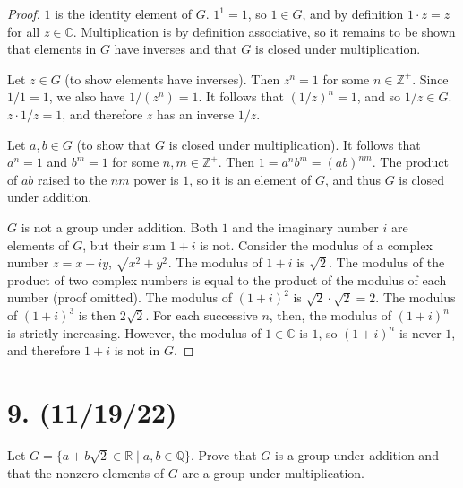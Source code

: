 \documentclass{article}
\begin{document}
\begin{proof}
      $1$ is the identity element of $G$. $1^1 = 1$, so $1 \in G$, and by definition $1 \cdot z = z$ for all $z \in \mathbb{C}$. Multiplication is by definition associative, so it remains to be shown that elements in $G$ have inverses and that $G$ is closed under multiplication.

      Let $z \in G$ (to show elements have inverses). Then $z^n = 1$ for some $n \in \mathbb{Z}^+$. Since $1/1 = 1$, we also have $1/(z^n) = 1$. It follows that $(1/z)^n = 1$, and so $1/z \in G$. $z \cdot 1/z = 1$, and therefore $z$ has an inverse $1/z$.

      Let $a, b \in G$ (to show that $G$ is closed under multiplication). It follows that $a^n = 1$ and $b^m = 1$ for some $n, m \in \mathbb{Z}^+$. Then $1 = a^n b^m = (ab)^{nm}$. The product of $ab$ raised to the $nm$ power is $1$, so it is an element of $G$, and thus $G$ is closed under addition.

      $G$ is not a group under addition. Both $1$ and the imaginary number $i$ are elements of $G$, but their sum $1 + i$ is not. Consider the modulus of a complex number $z = x + iy$, $\sqrt{x^2 + y^2}$. The modulus of $1 + i$ is $\sqrt{2}$. The modulus of the product of two complex numbers is equal to the product of the modulus of each number (proof omitted). The modulus of $(1 + i)^2$ is $\sqrt{2} \cdot \sqrt{2} = 2$. The modulus of $(1 + i)^3$ is then $2\sqrt{2}$. For each successive $n$, then, the modulus of $(1 + i)^n$ is strictly increasing. However, the modulus of $1 \in \mathbb{C}$ is $1$, so $(1 + i)^n$ is never $1$, and therefore $1 + i$ is not in $G$.
\end{proof}

\section*{9. (11/19/22)}

Let $G = \{a + b\sqrt{2} \in \mathbb{R} \mid a, b \in \mathbb{Q} \}$. Prove that $G$ is a group under addition and that the nonzero elements of $G$ are a group under multiplication.
\end{document}
